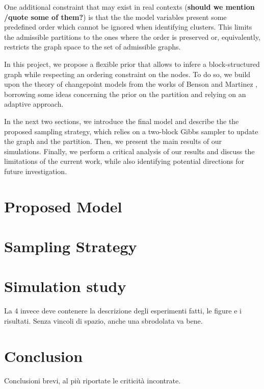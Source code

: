One additional constraint that may exist in real contexts (\textbf{should we mention /quote some of them?}) is that the the model variables present some predefined order which cannot be ignored when identifying clusters. This limits the admissible partitions to the ones where the order is preserved or, equivalently, restricts the graph space to the set of admissible graphs. 

In this project, we propose a flexible prior that allows to infere a block-structured graph while respecting an ordering constraint on the nodes. To do so, we build upon the theory of changepoint models from the works of Benson \cite{bensonAdaptiveMCMCMultiple2018} and Martinez \cite{martinezNonparametricChangePoint2014}, borrowing some ideas concerning the prior on the partition and relying on an adaptive approach. 

In the next two sections, we introduce the final model and describe the the proposed sampling strategy, which relies on a two-block Gibbs sampler to update the graph and the partition. Then, we present the main results of our simulations. Finally, we perform a critical analysis of our results and discuss the limitations of the current work, while also identifying potential directions for future investigation.  


\section{Proposed Model}


\section{Sampling Strategy}


\section{Simulation study}

La 4 invece deve contenere la descrizione degli esperimenti fatti, le figure e i risultati. Senza vincoli di spazio, anche una sbrodolata va bene.


\section{Conclusion}

Conclusioni brevi, al più riportate le criticità incontrate.